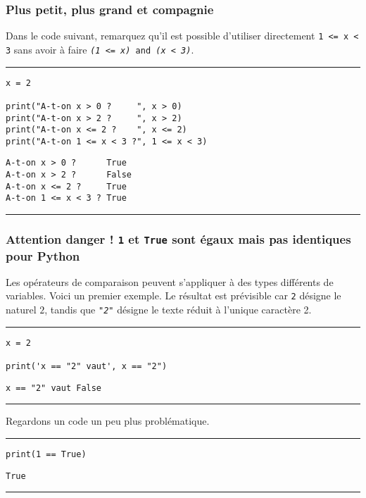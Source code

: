 \subsubsection{Plus petit, plus grand et compagnie}

Dans le code suivant, remarquez qu'il est possible d'utiliser directement \texttt{1 <= x < 3} sans avoir à faire \texttt{\textit{(1 <= x)} and \textit{(x < 3)}}.


\bigskip
{\hrule height .5mm}
\begin{verbatim}
x = 2

print("A-t-on x > 0 ?     ", x > 0)
print("A-t-on x > 2 ?     ", x > 2)
print("A-t-on x <= 2 ?    ", x <= 2)
print("A-t-on 1 <= x < 3 ?", 1 <= x < 3)
\end{verbatim}
 \color{ForestGreen}
\vspace{-1.5em}
\begin{verbatim}
A-t-on x > 0 ?      True
A-t-on x > 2 ?      False
A-t-on x <= 2 ?     True
A-t-on 1 <= x < 3 ? True
\end{verbatim} \color{Black}
{\hrule height .5mm}
\bigskip


\subsubsection{Attention danger ! \texttt{1} et \texttt{True} sont égaux mais pas identiques pour Python}

Les opérateurs de comparaison peuvent s'appliquer à des types différents de variables. Voici un premier exemple. Le résultat est prévisible car \texttt{2} désigne le naturel $2$, tandis que \texttt{\textit{"2"}} désigne le texte réduit à l'unique caractère 2.


\bigskip
{\hrule height .5mm}
\begin{verbatim}
x = 2

print('x == "2" vaut', x == "2")
\end{verbatim}
 \color{ForestGreen}
\vspace{-1.5em}
\begin{verbatim}
x == "2" vaut False
\end{verbatim} \color{Black}
{\hrule height .5mm}
\bigskip


Regardons un code un peu plus problématique.


\bigskip
{\hrule height .5mm}
\begin{verbatim}
print(1 == True)
\end{verbatim}
 \color{ForestGreen}
\vspace{-1.5em}
\begin{verbatim}
True
\end{verbatim} \color{Black}
{\hrule height .5mm}
\bigskip


